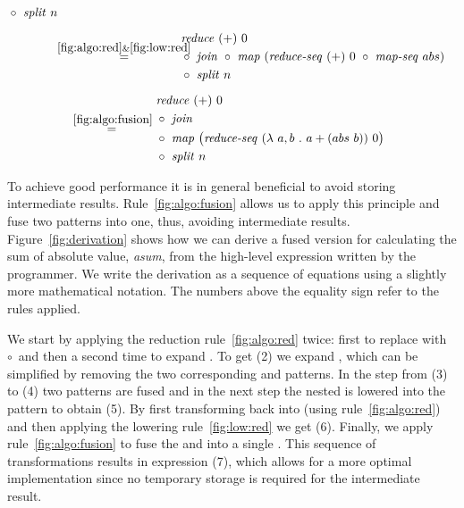 \begin{figure*}[t]
\begin{align*}
\begin{aligned}
\begin{aligned}
        &\circ\ \splitN\ n
      \end{aligned}\\[.5em]
  & \overset{\hspace{-1.3em}\ref{fig:algo:red}\& \ref{fig:low:red}\hspace{-1.1em}}{=\hspace{.2em}}
      \begin{aligned}
        & \reduce\ (+)\ 0\\
        &\circ\ \join\ \circ\ \map\ (\reduceSeq\ (+)\ 0\ \circ\ \mapSeq\ abs)\\
        &\circ\ \splitN\ n
      \end{aligned}\\[.5em]
  & \overset{\ref{fig:algo:fusion}}{=\hspace{.2em}}
      \begin{aligned}
        & \reduce\ (+)\ 0\\
        &\circ\ \join\\
        &\circ\ \map\ \big(\reduceSeq\ (\lambda\ a, b\ .\ a+(abs\ b))\ 0\big)\\
        &\circ\ \splitN\ n
      \end{aligned}
  \end{aligned}
\end{align*}
\caption{Derivation for \emph{asum}$(\vec{x})$ to a fused parallel version.
  The numbers above the equality sign refer to the rules from sections ....
}
\label{fig:derivation}
\end{figure*}




To achieve good performance it is in general beneficial to avoid storing intermediate results.
Rule~\ref{fig:algo:fusion} allows us to apply this principle and fuse two patterns into one, thus, avoiding intermediate results.
Figure~\ref{fig:derivation} shows how we can derive a fused version for calculating the sum of absolute value, \emph{asum}, from the high-level expression written by the programmer.
We write the derivation as a sequence of equations using a slightly more mathematical notation.
The numbers above the equality sign refer to the rules applied.

We start by applying the reduction rule~\ref{fig:algo:red} twice:
first to replace \reduce with \reduce~$\circ$~\partRed and then a second time to expand \partRed.
To get (2) we expand \map, which can be simplified by removing the two corresponding \join and \splitN patterns.
In the step from (3) to (4) two \map patterns are fused and in the next step the nested \map is lowered into the \mapSeq pattern to obtain (5).
By first transforming \partRed back into \reduce (using rule~\ref{fig:algo:red}) and then applying the lowering rule~\ref{fig:low:red} we get (6).
Finally, we apply rule~\ref{fig:algo:fusion} to fuse the \mapSeq and \reduceSeq into a single \reduceSeq.
This sequence of transformations results in expression (7), which allows for a more optimal implementation since no temporary storage is required for the intermediate result.



